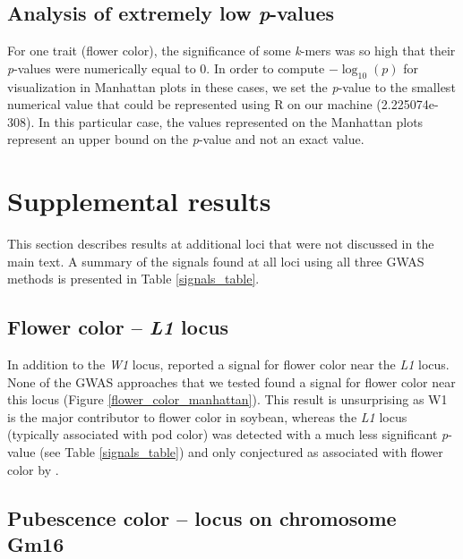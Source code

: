 \documentclass[12pt]{article}
\begin{document}
\subsection*{Analysis of extremely low \textit{p}-values}
\label{annexe-sv-gwas-pvalues}

For one trait (flower color), the significance of some \emph{k}-mers was so
high that their \emph{p}-values were numerically equal to 0. In order to
compute $-\log_{10} (p)$ for visualization in Manhattan plots in these cases,
we set the \emph{p}-value to the smallest numerical value that could be
represented using R on our machine (2.225074e-308). In this particular case,
the values represented on the Manhattan plots represent an upper bound on the
\emph{p}-value and not an exact value.

\section*{Supplemental results}
\label{annexe-sv-gwas-detailed-results}

This section describes results at additional loci that were not discussed in
the main text. A summary of the signals found at all loci using all three GWAS
methods is presented in Table \ref{signals_table}.

\subsection*{Flower color -- \textit{L1} locus}
\label{annexe-sv-gwas-flower-color-l1}

In addition to the \textit{W1} locus,  reported a signal for
flower color near the \textit{L1} locus.  None of the GWAS approaches that we
tested found a signal for flower color near this locus (Figure
\ref{flower_color_manhattan}). This result is unsurprising as W1 is the major
contributor to flower color in soybean, whereas the \textit{L1} locus
(typically associated with pod color) was detected with a much less significant
\textit{p}-value (see Table \ref{signals_table}) and only conjectured as
associated with flower color by .

\subsection*{Pubescence color -- locus on chromosome Gm16}
\label{annexe-sv-gwas-pubescence-color-gm16}
\end{document}
